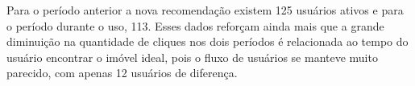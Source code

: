 
Para o período anterior a nova recomendação existem 125 usuários ativos e para o período durante o uso, 113. Esses dados reforçam ainda mais que a grande diminuição na quantidade de cliques nos dois períodos é relacionada ao tempo do usuário encontrar o imóvel ideal, pois o fluxo de usuários se manteve muito parecido, com apenas 12 usuários de diferença.

















